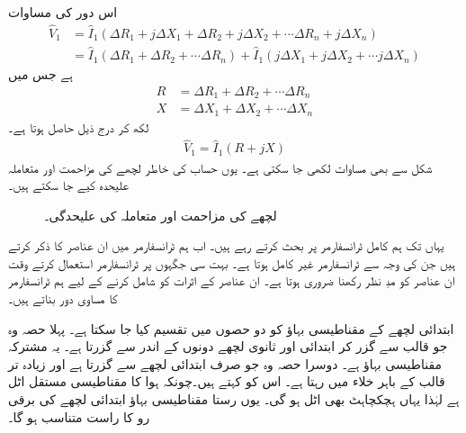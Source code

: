 اس دور کی مساوات 
\begin{align*}
\hat{V}_1&=\hat{I}_1 \left(\Delta R_1 + j \Delta X_1 +\Delta R_2 + j \Delta X_2 + \cdots \Delta R_n + j \Delta X_n   \right)\\
&=\hat{I}_1 \left(\Delta R_1 +\Delta R_2 +\cdots \Delta R_n   \right)+\hat{I}_1 \left(j \Delta X_1 + j \Delta X_2+\cdots   j \Delta X_n   \right)
\end{align*}
ہے جس میں
\begin{align*}
R&=\Delta R_1 +\Delta R_2 +\cdots \Delta R_n\\
X&=\Delta X_1 + \Delta X_2 +\cdots   \Delta X_n
\end{align*}
لکھ کر درج ذیل حاصل ہوتا ہے۔
\begin{align}\label{مساوات_ٹرانسفارمر_مزاحمت_علیحدہ}
\hat{V}_1=\hat{I}_1 \left( R +j X \right)
\end{align}
شکل   سے بھی مساوات  لکھی جا سکتی ہے۔ یوں حساب کی خاطر  لچھے کی مزاحمت اور متعاملہ  علیحدہ کیے جا سکتے ہیں۔
\begin{figure}
\centering
\caption{لچھے کی مزاحمت اور متعاملہ کی علیحدگی۔}
\label{شکل_ٹرانسفارمر_لچھے_کی_مزاحمت_اور_متعاملہ_کی_علیحدگی}
\end{figure}
%
یہاں تک ہم  کامل ٹرانسفارمر پر بحث کرتے رہے ہیں۔ اب ہم ٹرانسفارمر میں ان عناصر کا ذکر کرتے ہیں جن کی وجہ سے ٹرانسفارمر غیر کامل ہوتا ہے۔ بہت سی جگہوں پر ٹرانسفارمر استعمال کرتے وقت ان عناصر کو مدِ نظر رکھنا ضروری ہوتا ہے۔ ان عناصر کے اثرات کو شامل کرنے کے لیے ہم  ٹرانسفارمر کا مساوی دور بناتے ہیں۔

ابتدائی لچھے کے مقناطیسی بہاؤ کو دو حصوں میں تقسیم کیا جا سکتا ہے۔ پہلا حصہ وہ جو قالب سے گزر کر ابتدائی اور ثانوی لچھے دونوں کے اندر سے گزرتا ہے۔ یہ مشترکہ مقناطیسی بہاؤ ہے۔ دوسرا حصہ وہ جو صرف ابتدائی لچھے سے گزرتا ہے اور زیادہ تر قالب کے باہر خلاء میں رہتا ہے۔  اس کو    کہتے ہیں۔چونکہ ہوا کا مقناطیسی مستقل  اٹل ہے لہٰذا یہاں ہچکچاہٹ بھی اٹل ہو گی۔  یوں رستا مقناطیسی بہاؤ ابتدائی لچھے کی  برقی رو کا  راست متناسب ہو گا۔

